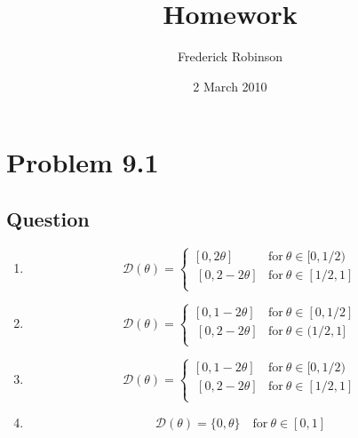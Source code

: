 \documentclass[12pt]{article}
\title{Homework}
\author{Frederick Robinson}
\date{2 March 2010}
\begin{document}

   \maketitle

\setcounter{tocdepth}{2} 

\tableofcontents


\section{Problem 9.1}
\subsection{Question}
\begin{enumerate}
\item
 \[
  \mathcal{D}(\theta)= 
  \left\{\begin{array}{ll} 
  [0,2 \theta] & \mathrm{for\ }\theta \in [0,1/2) \\ 
  \ \! \![0,2-2 \theta]& \mathrm{for\ }\theta \in [1/2,1] \\ 
  \end{array} \right.
   \]
\item
 \[
  \mathcal{D}(\theta)= 
  \left\{\begin{array}{ll} 
  [0,1-2 \theta] & \mathrm{for\ }\theta \in [0,1/2] \\ 
  \ \! \![0,2-2 \theta]& \mathrm{for\ }\theta \in (1/2,1] \\ 
  \end{array} \right.
   \]
   \item
 \[
  \mathcal{D}(\theta)= 
  \left\{\begin{array}{ll} 
  [0,1-2 \theta] & \mathrm{for\ }\theta \in [0,1/2) \\ 
  \ \! \![0,2-2 \theta]& \mathrm{for\ }\theta \in [1/2,1] \\ 
  \end{array} \right.\]
   \item\[
   \mathcal{D}(\theta)= \{0,\theta\} \quad \mathrm{for\ } \theta \in [0,1]
   \]\end{enumerate}
\end{document}
